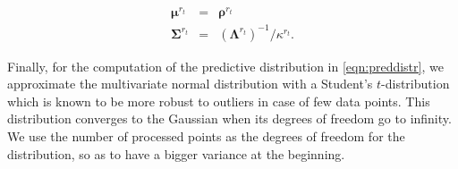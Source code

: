 \begin{eqnarray}
\label{eqn:ssmvn}
\boldsymbol{\mu}^{r_{t}}&=&\boldsymbol{\rho}^{r_{t}}\nonumber\\
\boldsymbol{\Sigma}^{r_{t}}&=&(\boldsymbol{\Lambda}^{r_{t}})^{-1}/\kappa^{r_{t}}.
\end{eqnarray}

Finally, for the computation of the predictive distribution in
\eqref{eqn:preddistr}, we approximate the multivariate normal distribution with
a Student's $t$-distribution which is known to be more robust to outliers in
case of few data points. This distribution converges to the Gaussian when its
degrees of freedom go to infinity. We use the number of processed points as the
degrees of freedom for the distribution, so as to have a bigger variance at the
beginning.
